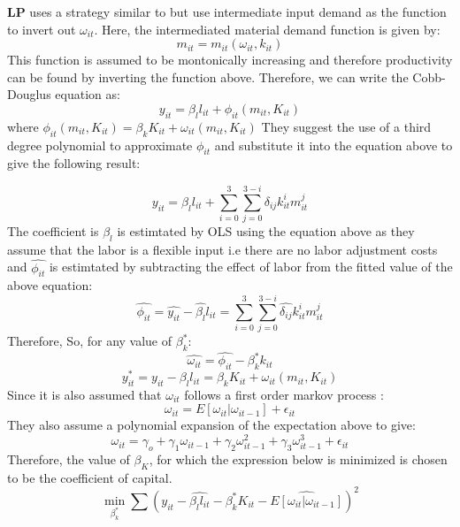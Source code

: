 \documentclass[11pt]{article}
\begin{document}
\textcite{levinsohn2003estimating} \textbf{LP} uses a  strategy
similar to \textcite{olley1992dynamics} but use intermediate input demand
as the function to invert out $\omega_{it}$. 
Here, the intermediated material demand function is given by:
$$  m_{it} = m_{it}(\omega_{it}, k_{it})$$
This function is assumed to be montonically increasing and therefore
productivity can be found by inverting the function above. Therefore,
we can write the Cobb-Douglus equation  as: 
$$ y_{it} = \beta_{l}l_{it} + \phi_{it}(m_{it},K_{it})$$
where $\phi_{it}(m_{it},K_{it}) =  \beta_{k}K_{it}+ \omega_{it}(m_{it}, K_{it})$
They suggest the  use of a third degree polynomial to approximate 
$\phi_{it}$ and substitute it into the equation above to give the
following result: 

$$  y_{it} =  \beta_{l}l_{it} + \sum_{i=0}^{3} \sum_{j=0}^{3-i}
\delta_{ij}k_{it}^{i}m_{it}^{j}$$
The coefficient is $\beta_{l}$ is estimtated by OLS using the equation
above as they assume that the labor is a flexible input i.e there are
no labor adjustment costs and $\hat{\phi_{it}}$ is estimtated by
subtracting the effect of labor from
the fitted value of the above equation:
$$ \hat{\phi_{it}} = \hat{y_{it}} - \hat{\beta_{l}}l_{it} =
 \sum_{i=0}^{3} \sum_{j=0}^{3-i}
\hat{\delta_{ij}}k_{it}^{i}m_{it}^{j}$$
Therefore, 
So, for any value of $\beta_{k}^{*}$:
$$\hat{\omega_{it}} = \hat{\phi_{it}} - \beta_{k}^{*}k_{it}$$
$$ y_{it}^{*} = y_{it} - \beta_{l}l_{it} = \beta_{k}K_{it}
+ \omega_{it}(m_{it}, K_{it})$$
Since it is also assumed that $\omega_{it}$ follows a first order markov
process : 
$$\omega_{it} = E[\omega_{it}|\omega_{it-1}] + \epsilon_{it}$$
They also assume a polynomial expansion of the expectation above to give:
$$ \omega_{it}=  \gamma_{o}+\gamma_{1}\omega_{it-1} +
\gamma_{2}\omega_{it-1}^2 + \gamma_{3}\omega_{it-1}^3 + \epsilon_{it} $$ 
Therefore, the value of $\beta_{K}$, for which the expression below is
minimized is chosen to be the coefficient of capital.  
\begin{equation}
\min_{\beta_{k}^{*}}\sum (y_{it} - \hat{\beta_{l}l_{it}} -
\beta_{k}^{*}K_{it} - \hat{E[\omega_{it}|\omega_{it-1}]})^2 
\end{equation}
\end{document}
